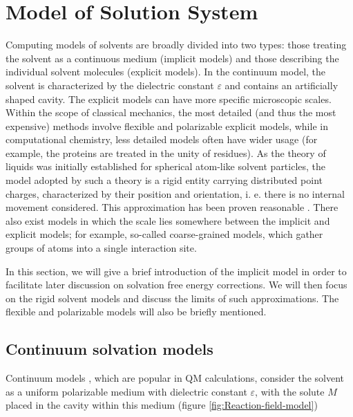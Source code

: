 
\chapter{Model of Solution System\label{chpt:models}}

Computing models of solvents are broadly divided into two types: those
treating the solvent as a continuous medium (implicit models) and
those describing the individual solvent molecules (explicit models).
In the continuum model, the solvent is characterized by the dielectric
constant $\varepsilon$ and contains an artificially shaped cavity.
The explicit models can have more specific microscopic scales. Within
the scope of classical mechanics, the most detailed (and thus the
most expensive) methods involve flexible and polarizable explicit
models, while in computational chemistry, less detailed models often
have wider usage (for example, the proteins are treated in the unity
of residues). As the theory of liquids was initially established for
spherical atom-like solvent particles, the model adopted by such a
theory is a rigid entity carrying distributed point charges, characterized
by their position and orientation, i. e. there is no internal movement
considered. This approximation has been proven reasonable \citep{Gray-Gubbins}.
There also exist models in which the scale lies somewhere between
the implicit and explicit models; for example, so-called coarse-grained
models, which gather groups of atoms into a single interaction site.

In this section, we will give a brief introduction of the implicit
model in order to facilitate later discussion on solvation free energy
corrections. We will then focus on the rigid solvent models and discuss
the limits of such approximations. The flexible and polarizable models
will also be briefly mentioned. 

\section{Continuum solvation models}

Continuum models \citep{Jensen,Cramer_1999,Tomasi_1994_implicit_model},
which are popular in QM calculations, consider the solvent as a uniform
polarizable medium with dielectric constant $\varepsilon$, with the solute $M$ placed in the cavity within this medium (figure
\ref{fig:Reaction-field-model}) 

